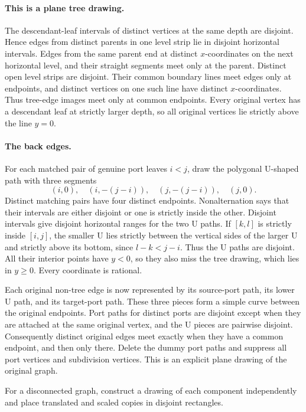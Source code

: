 \documentclass[11pt]{article}
\begin{document}
\paragraph{This is a plane tree drawing.}
The descendant-leaf intervals of distinct vertices at the same depth are
disjoint. Hence edges from distinct parents in one level strip lie in disjoint
horizontal intervals. Edges from the same parent end at distinct
$x$-coordinates on the next horizontal level, and their straight segments meet
only at the parent. Distinct open level strips are disjoint. Their common
boundary lines meet edges only at endpoints, and distinct vertices on one such
line have distinct $x$-coordinates. Thus tree-edge images meet only at common
endpoints. Every original vertex has a descendant leaf at strictly larger
depth, so all original vertices lie strictly above the line $y=0$.

\paragraph{The back edges.}
For each matched pair of genuine port leaves $i<j$, draw the polygonal U-shaped
path with three segments
\begin{equation*}
(i,0),\quad(i,-(j-i)),\quad(j,-(j-i)),\quad(j,0).
\end{equation*}
Distinct matching pairs have four distinct endpoints. Nonalternation says that
their intervals are either disjoint or one is strictly inside the other.
Disjoint intervals give disjoint horizontal ranges for the two U paths. If
$[k,l]$ is strictly inside $[i,j]$, the smaller U lies strictly between the
vertical sides of the larger U and strictly above its bottom, since $l-k<j-i$.
Thus the U paths are disjoint. All their interior points have $y<0$, so they
also miss the tree drawing, which lies in $y\ge0$. Every coordinate is
rational.

Each original non-tree edge is now represented by its source-port path, its
lower U path, and its target-port path. These three pieces form a simple curve
between the original endpoints. Port paths for distinct ports are disjoint
except when they are attached at the same original vertex, and the U pieces are
pairwise disjoint. Consequently distinct original edges meet exactly when they
have a common endpoint, and then only there. Delete the dummy port paths and
suppress all port vertices and subdivision vertices. This is an explicit plane
drawing of the original graph.

For a disconnected graph, construct a drawing of each component independently
and place translated and scaled copies in disjoint rectangles.
\end{document}
